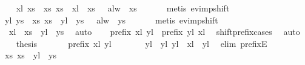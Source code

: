 \begin{isabellebody}
%
\isadelimproof
%
\endisadelimproof
%
\isatagproof
{}\isamarkupfalse%
{\isacharminus}\isanewline
\ \ \isamarkupfalse%
\ xl\ xs{}\ \ xs{}{\isacharcolon}\ {\isachardoublequoteopen}xs\ {\isacharequal}\ xl\ {\isacharat}{\isacharminus}\ xs{}{\isachardoublequoteclose}\ \ {\isasymphi}{\isasymphi}{\isacharcolon}\ {\isachardoublequoteopen}alw\ {\isasymphi}\ xs{}{\isachardoublequoteclose}\isanewline
\ \ \isamarkupfalse%
\ {\isasymphi}\ \isamarkupfalse%
\ {\isacharparenleft}metis\ ev{\isacharunderscore}imp{\isacharunderscore}shift{\isacharparenright}\isanewline
\ \ \isamarkupfalse%
\ \isamarkupfalse%
\ yl\ ys{}\ \ xs{}{\isacharcolon}\ {\isachardoublequoteopen}xs\ {\isacharequal}\ yl\ {\isacharat}{\isacharminus}\ ys{}{\isachardoublequoteclose}\ \ {\isasympsi}{\isasympsi}{\isacharcolon}\ {\isachardoublequoteopen}alw\ {\isasympsi}\ ys{}{\isachardoublequoteclose}\isanewline
\ \ \isamarkupfalse%
\ {\isasympsi}\ \isamarkupfalse%
\ {\isacharparenleft}metis\ ev{\isacharunderscore}imp{\isacharunderscore}shift{\isacharparenright}\isanewline
\ \ \isamarkupfalse%
\ \isamarkupfalse%
\ {}{\isacharcolon}\ {\isachardoublequoteopen}xl\ {\isacharat}{\isacharminus}\ xs{}\ {\isacharequal}\ yl\ {\isacharat}{\isacharminus}\ ys{}{\isachardoublequoteclose}\ \isamarkupfalse%
\ auto\isanewline
\ \ \isamarkupfalse%
\ {\isachardoublequoteopen}prefix\ xl\ yl\ {\isasymor}\ prefix\ yl\ xl{\isachardoublequoteclose}\ \isamarkupfalse%
\ shift{\isacharunderscore}prefix{\isacharunderscore}cases\ \isamarkupfalse%
\ auto\isanewline
\ \ \isamarkupfalse%
\ {\isacharquery}thesis\ \isamarkupfalse%
\isanewline
\ \ \ \ \isamarkupfalse%
\ {\isachardoublequoteopen}prefix\ xl\ yl{\isachardoublequoteclose}\isanewline
\ \ \ \ \isamarkupfalse%
\ \isamarkupfalse%
\ yl{}\ \ yl{\isacharcolon}\ {\isachardoublequoteopen}yl\ {\isacharequal}\ xl\ {\isacharat}\ yl{}{\isachardoublequoteclose}\ \isamarkupfalse%
\ {\isacharparenleft}elim\ prefixE{\isacharparenright}\isanewline
\ \ \ \ \isamarkupfalse%
\ xs{}{\isacharprime}{\isacharcolon}\ {\isachardoublequoteopen}xs{}\ {\isacharequal}\ yl{}\ {\isacharat}{\isacharminus}\ ys{}{\isachardoublequoteclose}\ \isamarkupfalse%

\end{isabellebody}
